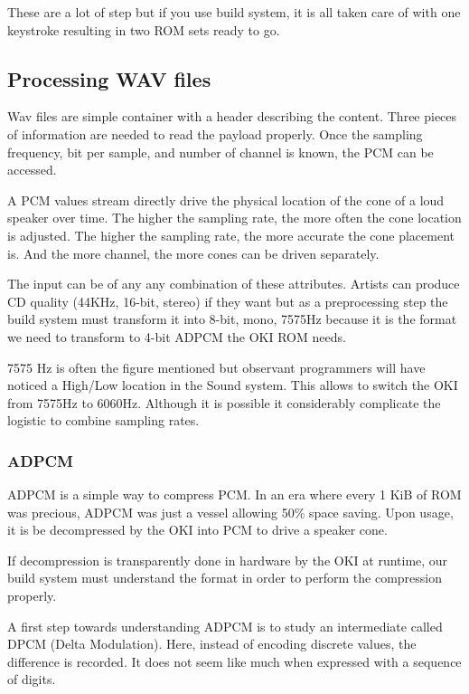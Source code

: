 \begin{trivia}
These are a lot of step but if you use  build system, it is all taken care of with one keystroke resulting in two ROM sets ready to go.
\end{trivia}

\subsection{Processing WAV files}
Wav files are simple container with a header describing the content. Three pieces of information are needed to read the payload properly. Once the sampling frequency, bit per sample, and number of channel is known, the PCM can be accessed.

A PCM values stream directly drive the physical location of the cone of a loud speaker over time. The higher the sampling rate, the more often the cone location is adjusted. The higher the sampling rate, the more accurate the cone placement is. And the more channel, the more cones can be driven separately.

The input can be of any any combination of these attributes. Artists can produce CD quality (44KHz, 16-bit, stereo) if they want but as a preprocessing step the build system must transform it into 8-bit, mono, 7575Hz because it is the format we need to transform to 4-bit ADPCM the OKI ROM needs.

\begin{trivia}
7575 Hz is often the figure mentioned but observant programmers will have noticed a High/Low  location in the Sound system. This allows to switch the OKI from 7575Hz to 6060Hz. Although it is possible it considerably complicate the logistic to combine sampling rates. 
\end{trivia}

\subsubsection{ADPCM}
ADPCM is a simple way to compress PCM. In an era where every 1 KiB of ROM was precious, ADPCM was just a vessel allowing 50\% space saving. Upon usage, it is be decompressed by the OKI into PCM to drive a speaker cone.
 
 

If decompression is transparently done in hardware by the OKI at runtime, our build system must understand the format in order to perform the compression properly. 

A first step towards understanding ADPCM is to study an intermediate called DPCM (Delta Modulation). Here, instead of encoding discrete values, the difference is recorded. It does not seem like much when expressed with a sequence of digits.

